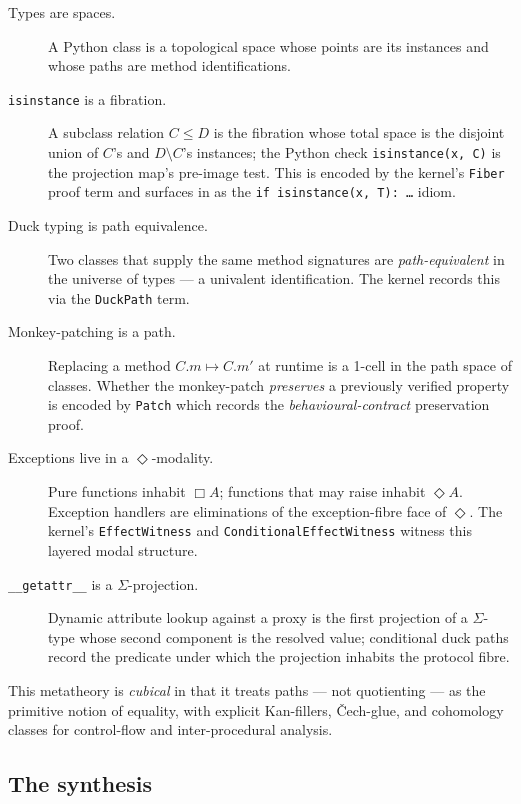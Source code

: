 \begin{description}
  \item[Types are spaces.]  A Python class is a topological space
  whose points are its instances and whose paths are method
  identifications.

  \item[\texttt{isinstance} is a fibration.]  A subclass relation
  $C \le D$ is the fibration whose total space is the disjoint union
  of $C$'s and $D \setminus C$'s instances; the Python check
  \texttt{isinstance(x, C)} is the projection map's pre-image test.
  This is encoded by the kernel's \texttt{Fiber} proof term and
  surfaces in \PSDL{} as the \texttt{if isinstance(x, T): \dots} idiom.

  \item[Duck typing is path equivalence.]  Two classes that supply
  the same method signatures are \emph{path-equivalent} in the
  universe of types --- a univalent identification.  The kernel
  records this via the \texttt{DuckPath} term.

  \item[Monkey-patching is a path.]  Replacing a method
  $C.m \mapsto C.m'$ at runtime is a 1-cell in the path space of
  classes.  Whether the monkey-patch \emph{preserves} a previously
  verified property is encoded by \texttt{Patch} which records the
  \emph{behavioural-contract} preservation proof.

  \item[Exceptions live in a $\Diamond$-modality.]  Pure functions
  inhabit $\Box A$; functions that may raise inhabit $\Diamond A$.
  Exception handlers are eliminations of the exception-fibre face of
  $\Diamond$.  The kernel's \texttt{EffectWitness} and
  \texttt{ConditionalEffectWitness} witness this layered modal
  structure.

  \item[\texttt{\_\_getattr\_\_} is a $\Sigma$-projection.]
  Dynamic attribute lookup against a proxy is the first projection of
  a $\Sigma$-type whose second component is the resolved value;
  conditional duck paths record the predicate under which the
  projection inhabits the protocol fibre.
\end{description}

This metatheory is \emph{cubical} in that it treats paths --- not
quotienting --- as the primitive notion of equality, with explicit
Kan-fillers, Čech-glue, and cohomology classes for control-flow and
inter-procedural analysis.

\subsection*{The synthesis}

